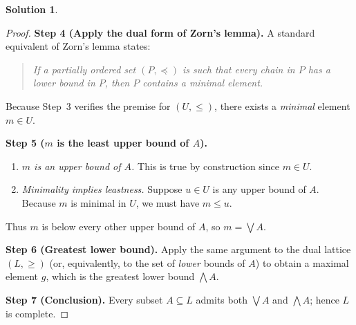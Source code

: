 \documentclass[12pt]{article}
\theoremstyle{definition} %
\newtheorem{solution}{Solution}
\theoremstyle{plain} %
\begin{document}
\begin{solution}
\begin{proof}
        \smallskip
        \textbf{Step 4 (Apply the dual form of Zorn’s lemma).}
        A standard equivalent of Zorn’s lemma states:
        
        \begin{quote}
        \emph{If a partially ordered set $(P,\preceq)$ is such that every
        chain in $P$ has a lower bound in $P$, then $P$ contains a
        minimal element.}
        \end{quote}
        
        Because Step~3 verifies the premise for $(U,\le)$,
        there exists a \emph{minimal} element $m\in U$.
        
        \smallskip
        \textbf{Step 5 ($m$ is the least upper bound of $A$).}
        \begin{enumerate}[label=\textup{(\alph*)},wide,labelindent=0pt]
          \item \emph{$m$ is an upper bound of $A$.}
                This is true by construction since $m\in U$.
          \item \emph{Minimality implies leastness.}
                Suppose $u\in U$ is any upper bound of $A$.
                Because $m$ is minimal in $U$, we must have $m\le u$.
        \end{enumerate}
        Thus $m$ is below every other upper bound of $A$,
        so $m=\bigvee A$.
        
        \smallskip
        \textbf{Step 6 (Greatest lower bound).}
        Apply the same argument to the dual lattice $(L,\ge)$
        (or, equivalently, to the set of \emph{lower} bounds of $A$)
        to obtain a maximal element $g$, which is the greatest
        lower bound $\bigwedge A$.
        
        \smallskip
        \textbf{Step 7 (Conclusion).}
        Every subset $A\subseteq L$ admits both $\bigvee A$ and $\bigwedge A$;
        hence $L$ is complete.
        \end{proof}
    \end{solution}
\end{document}
